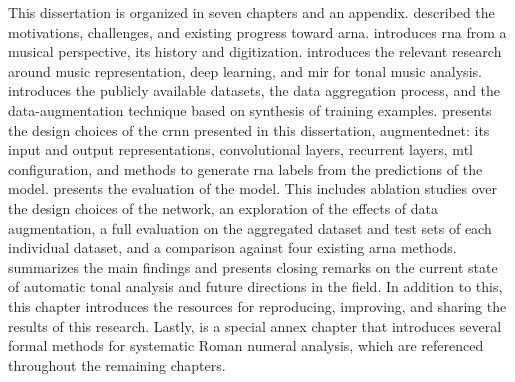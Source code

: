 
This dissertation is organized in seven chapters and an
appendix.  described the motivations,
challenges, and existing progress toward \gls{arna}.
 introduces
\gls{rna} from a musical perspective, its history and
digitization.  introduces the relevant
research around music representation, deep learning, and
\gls{mir} for tonal music analysis.
 introduces the
publicly available datasets, the data aggregation process,
and the data-augmentation technique based on synthesis of
training examples.  presents the design
choices of the \gls{crnn} presented in this dissertation,
\gls{augmentednet}: its input and output representations,
convolutional layers, recurrent layers, \gls{mtl}
configuration, and methods to generate \gls{rna} labels from
the predictions of the model.
 presents the evaluation of
the model. This includes ablation studies over the design
choices of the network, an exploration of the effects of
data augmentation, a full evaluation on the aggregated
dataset and test sets of each individual dataset, and a
comparison against four existing \gls{arna} methods.
 summarizes the main findings and
presents closing remarks on the current state of automatic
tonal analysis and future directions in the field. In
addition to this, this chapter introduces the resources for
reproducing, improving, and sharing the results of this
research. Lastly,
 is a
special annex chapter that introduces several formal methods
for systematic Roman numeral analysis, which are referenced
throughout the remaining chapters.
